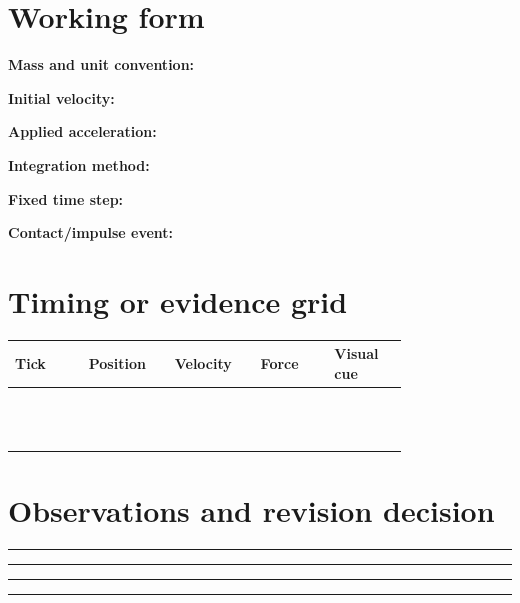 \documentclass[10pt,letterpaper]{article}
\begin{document}
\section{Working form}
\noindent\textbf{Mass and unit convention:}\quad\hrulefill\par\vspace{10pt}
\noindent\textbf{Initial velocity:}\quad\hrulefill\par\vspace{10pt}
\noindent\textbf{Applied acceleration:}\quad\hrulefill\par\vspace{10pt}
\noindent\textbf{Integration method:}\quad\hrulefill\par\vspace{10pt}
\noindent\textbf{Fixed time step:}\quad\hrulefill\par\vspace{10pt}
\noindent\textbf{Contact/impulse event:}\quad\hrulefill\par\vspace{10pt}\section{Timing or evidence grid}
\begin{longtable}{|p{0.156\linewidth}|p{0.156\linewidth}|p{0.156\linewidth}|p{0.156\linewidth}|p{0.156\linewidth}|}
\hline
\textbf{Tick} & \textbf{Position} & \textbf{Velocity} & \textbf{Force} & \textbf{Visual cue}\\\hline
\endhead
\rule{0pt}{20pt} &  &  &  & \\\hline
\rule{0pt}{20pt} &  &  &  & \\\hline
\rule{0pt}{20pt} &  &  &  & \\\hline
\rule{0pt}{20pt} &  &  &  & \\\hline
\rule{0pt}{20pt} &  &  &  & \\\hline
\rule{0pt}{20pt} &  &  &  & \\\hline
\rule{0pt}{20pt} &  &  &  & \\\hline
\rule{0pt}{20pt} &  &  &  & \\\hline
\rule{0pt}{20pt} &  &  &  & \\\hline
\rule{0pt}{20pt} &  &  &  & \\\hline
\rule{0pt}{20pt} &  &  &  & \\\hline
\rule{0pt}{20pt} &  &  &  & \\\hline
\end{longtable}
\section{Observations and revision decision}
\noindent\rule{\linewidth}{0.4pt}\par\vspace{18pt}\noindent\rule{\linewidth}{0.4pt}\par\vspace{18pt}\noindent\rule{\linewidth}{0.4pt}\par\vspace{18pt}\noindent\rule{\linewidth}{0.4pt}\par\vspace{18pt}
\end{document}

